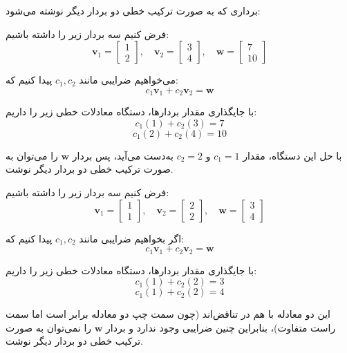 \begin{example}
برداری که به صورت ترکیب خطی دو بردار دیگر نوشته می‌شود:
	
	فرض کنیم سه بردار زیر را داشته باشیم:
	\[
	\mathbf{v}_1 = \begin{bmatrix} 1 \\ 2 \end{bmatrix}, \quad
	\mathbf{v}_2 = \begin{bmatrix} 3 \\ 4 \end{bmatrix}, \quad
	\mathbf{w} = \begin{bmatrix} 7 \\ 10 \end{bmatrix}
	\]
	
	می‌خواهیم ضرایبی مانند \( c_1, c_2 \) پیدا کنیم که:
	\[
	c_1 \mathbf{v}_1 + c_2 \mathbf{v}_2 = \mathbf{w}
	\]
	
	با جایگذاری مقدار بردارها، دستگاه معادلات خطی زیر را داریم:
	\[
	c_1 (1) + c_2 (3) = 7
	\]
	\[
	c_1 (2) + c_2 (4) = 10
	\]
	
	با حل این دستگاه، مقدار \( c_1 = 1 \) و \( c_2 = 2 \) به‌دست می‌آید، پس بردار \( \mathbf{w} \) را می‌توان به صورت ترکیب خطی دو بردار دیگر نوشت.
	
\end{example}

\begin{example}

فرض کنیم سه بردار زیر را داشته باشیم:
\[
\mathbf{v}_1 = \begin{bmatrix} 1 \\ 1 \end{bmatrix}, \quad
\mathbf{v}_2 = \begin{bmatrix} 2 \\ 2 \end{bmatrix}, \quad
\mathbf{w} = \begin{bmatrix} 3 \\ 4 \end{bmatrix}
\]

اگر بخواهیم ضرایبی مانند \( c_1, c_2 \) پیدا کنیم که:
\[
c_1 \mathbf{v}_1 + c_2 \mathbf{v}_2 = \mathbf{w}
\]

با جایگذاری مقدار بردارها، دستگاه معادلات خطی زیر را داریم:
\[
c_1 (1) + c_2 (2) = 3
\]
\[
c_1 (1) + c_2 (2) = 4
\]

این دو معادله با هم در تناقض‌اند (چون سمت چپ دو معادله برابر است اما سمت راست متفاوت)، بنابراین چنین ضرایبی وجود ندارد و بردار \( \mathbf{w} \) را نمی‌توان به صورت ترکیب خطی دو بردار دیگر نوشت.
\end{example}

